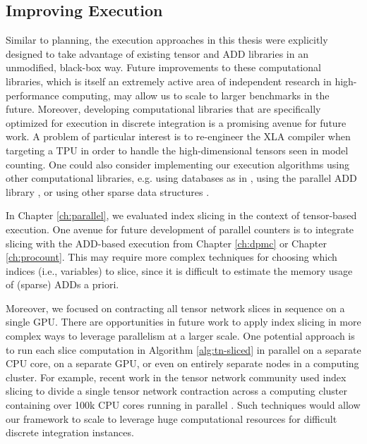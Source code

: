 \subsection{Improving Execution}
Similar to planning, the execution approaches in this thesis were explicitly designed to take advantage of existing tensor and ADD libraries in an unmodified, black-box way.
Future improvements to these computational libraries, which is itself an extremely active area of independent research in high-performance computing, may allow us to scale to larger benchmarks in the future.
Moreover, developing computational libraries that are specifically optimized for execution in discrete integration is a promising avenue for future work.
A problem of particular interest is to re-engineer the XLA compiler when targeting a TPU in order to handle the high-dimensional tensors seen in model counting.
One could also consider implementing our execution algorithms using other computational libraries, e.g. using databases as in \cite{fichte2020exploiting}, using the parallel ADD library \sylvan{} \cite{van2015sylvan}, or using other sparse data structures \cite{sanner2005affine,baskaran2012efficient,li2018hicoo}.

In Chapter \ref{ch:parallel}, we evaluated index slicing in the context of tensor-based execution.
One avenue for future development of parallel counters is to integrate slicing with the ADD-based execution from Chapter \ref{ch:dpmc} or Chapter \ref{ch:procount}.
This may require more complex techniques for choosing which indices (i.e., variables) to slice, since it is difficult to estimate the memory usage of (sparse) ADDs a priori.

Moreover, we focused on contracting all tensor network slices in sequence on a single GPU.
There are opportunities in future work to apply index slicing in more complex ways to leverage parallelism at a larger scale. 
One potential approach is to run each slice computation in Algorithm \ref{alg:tn-sliced} in parallel on a separate CPU core, on a separate GPU, or even on entirely separate nodes in a computing cluster.
For example, recent work in the tensor network community used index slicing to divide a single tensor network contraction across a computing cluster containing over 100k CPU cores running in parallel \cite{CZHNS18}.
Such techniques would allow our framework to scale to leverage huge computational resources for difficult discrete integration instances.


